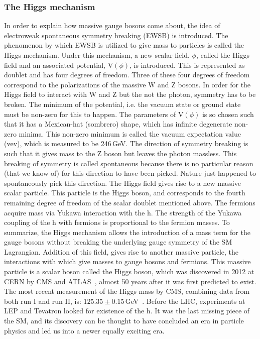 \subsubsection{The Higgs mechanism}
In order to explain how massive gauge bosons come about, the idea of electroweak spontaneous symmetry breaking (EWSB) is introduced. The phenomenon by which EWSB is utilized to give mass to particles is called the Higgs mechanism. Under this mechanism, a new scalar field, $\phi$, called the Higgs field and an associated potential, V$(\phi)$, is introduced. This is represented as doublet and has four degrees of freedom. Three of these four degrees of freedom correspond to the polarizations of the massive W and Z bosons. In order for the Higgs field to interact with W and Z but the not the photon, symmetry has to be broken. The minimum of the potential, i.e. the vacuum state or ground state must be non-zero for this to happen. The parameters of V$(\phi)$ is so chosen such that it has a Mexican-hat (sombrero) shape, which has infinite degenerate non-zero minima. This non-zero minimum is called the vacuum expectation value (vev), which is measured to be 246\,GeV. The direction of symmetry breaking is such that it gives mass to the Z boson but leaves the photon massless. This breaking of symmetry is called spontaneous because there is no particular reason (that we know of) for this direction to have been picked. Nature just happened to spontaneously pick this direction. The Higgs field gives rise to a new massive scalar particle. This particle is the Higgs boson, and corresponds to the fourth remaining degree of freedom of the scalar doublet mentioned above. The fermions acquire mass via Yukawa interaction with the h. The strength of the Yukawa coupling of the h with fermions is proportional to the fermion masses. To summarize, the Higgs mechanism allows the introduction of a mass term for the gauge bosons without breaking the underlying gauge symmetry of the SM Lagrangian. Addition of this field, gives rise to another massive particle, the interactions with which give masses to gauge bosons and fermions. This massive particle is a scalar boson called the Higgs boson, which was discovered in 2012 at CERN by CMS and ATLAS~\cite{Aad:2012tfa, Chatrchyan:2012ufa, Chatrchyan:2013lba}, almost 50 years after it was first predicted to exist. The most recent measurement of the Higgs mass by CMS, combining data from both run I and run II, is: $125.35\pm0.15$\,GeV~\cite{HIG-19-004}. Before the LHC, experiments at LEP and Tevatron looked for existence of the h. It was the last missing piece of the SM, and its discovery can be thought to have concluded an era in particle physics and led us into a newer equally exciting era.


